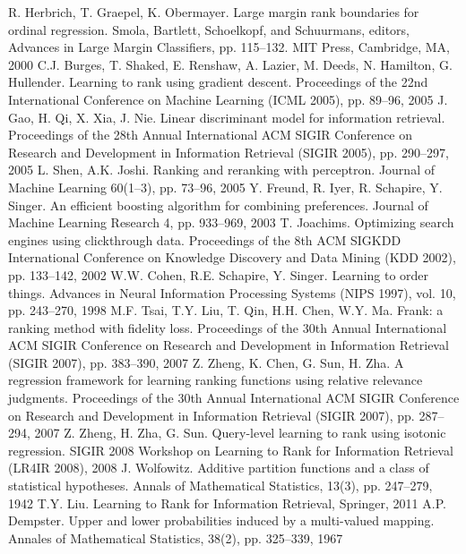 \documentclass[12pt,a4paper,oneside]{article}
\begin{document}
\begin{thebibliography}{9}
	 R. Herbrich, T. Graepel, K. Obermayer. Large margin rank boundaries for ordinal regression. Smola, Bartlett, Schoelkopf, and Schuurmans, editors, Advances in Large Margin Classifiers, pp. 115–132. MIT Press, Cambridge, MA, 2000%
	 C.J. Burges, T. Shaked, E. Renshaw, A. Lazier, M. Deeds, N. Hamilton, G. Hullender. Learning to rank using gradient descent. Proceedings of the 22nd International Conference on Machine Learning (ICML 2005), pp. 89–96, 2005%
	 J. Gao, H. Qi, X. Xia, J. Nie. Linear discriminant model for information retrieval. Proceedings of the 28th Annual International ACM SIGIR Conference on Research and Development in Information Retrieval (SIGIR 2005), pp. 290–297, 2005%
	 L. Shen, A.K. Joshi. Ranking and reranking with perceptron. Journal of Machine Learning 60(1–3), pp. 73–96, 2005%
	 Y. Freund, R. Iyer, R. Schapire, Y. Singer. An efficient boosting algorithm for combining preferences. Journal of Machine Learning Research 4, pp. 933–969, 2003%
	 T. Joachims. Optimizing search engines using clickthrough data. Proceedings of the 8th ACM SIGKDD International Conference on Knowledge Discovery and Data Mining (KDD 2002), pp. 133–142, 2002%
	 W.W. Cohen, R.E. Schapire, Y. Singer. Learning to order things. Advances in Neural Information Processing Systems (NIPS 1997), vol. 10, pp. 243–270, 1998%
	 M.F. Tsai, T.Y. Liu, T. Qin, H.H. Chen, W.Y. Ma. Frank: a ranking method with fidelity loss. Proceedings of the 30th Annual International ACM SIGIR Conference on Research and Development in Information Retrieval (SIGIR 2007), pp. 383–390, 2007%
	 Z. Zheng, K. Chen, G. Sun, H. Zha. A regression framework for learning ranking functions using relative relevance judgments. Proceedings of the 30th Annual International ACM SIGIR Conference on Research and Development in Information Retrieval (SIGIR 2007), pp. 287–294, 2007%
	 Z. Zheng, H. Zha, G. Sun. Query-level learning to rank using isotonic regression. SIGIR 2008 Workshop on Learning to Rank for Information Retrieval (LR4IR 2008), 2008%
	 J. Wolfowitz. Additive partition functions and a class of statistical hypotheses. Annals of Mathematical Statistics, 13(3), pp. 247–279, 1942%
	 T.Y. Liu. Learning to Rank for Information Retrieval, Springer, 2011%
	 A.P. Dempster. Upper and lower probabilities induced by a multi-valued mapping. Annales of Mathematical Statistics, 38(2), pp. 325–339, 1967%

\end{thebibliography}
\end{document}
